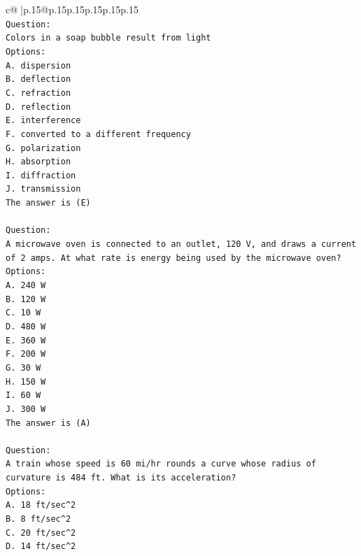 \documentclass{article}
\begin{document}
{\begin{supertabular}{c@{$\;$}|p{.15\linewidth}@{}p{.15\linewidth}p{.15\linewidth}p{.15\linewidth}p{.15\linewidth}p{.15\linewidth}}
{{{\\ 
\texttt{Question:} \\
\texttt{Colors in a soap bubble result from light} \\
\texttt{Options:} \\
\texttt{A. dispersion} \\
\texttt{B. deflection} \\
\texttt{C. refraction} \\
\texttt{D. reflection} \\
\texttt{E. interference} \\
\texttt{F. converted to a different frequency} \\
\texttt{G. polarization} \\
\texttt{H. absorption} \\
\texttt{I. diffraction} \\
\texttt{J. transmission} \\
\texttt{The answer is (E)} \\
\\ 
\texttt{Question:} \\
\texttt{A microwave oven is connected to an outlet, 120 V, and draws a current of 2 amps. At what rate is energy being used by the microwave oven?} \\
\texttt{Options:} \\
\texttt{A. 240 W} \\
\texttt{B. 120 W} \\
\texttt{C. 10 W} \\
\texttt{D. 480 W} \\
\texttt{E. 360 W} \\
\texttt{F. 200 W} \\
\texttt{G. 30 W} \\
\texttt{H. 150 W} \\
\texttt{I. 60 W} \\
\texttt{J. 300 W} \\
\texttt{The answer is (A)} \\
\\ 
\texttt{Question:} \\
\texttt{A train whose speed is 60 mi/hr rounds a curve whose radius of curvature is 484 ft. What is its acceleration?} \\
\texttt{Options:} \\
\texttt{A. 18 ft/sec\^{}2} \\
\texttt{B. 8 ft/sec\^{}2} \\
\texttt{C. 20 ft/sec\^{}2} \\
\texttt{D. 14 ft/sec\^{}2} \\
}}}
\end{supertabular}}
\end{document}
